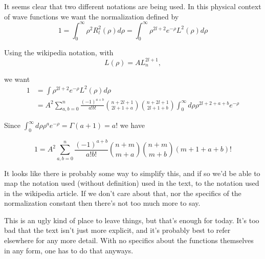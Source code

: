 It seems clear that two different notations are being used.  In this physical context of wave functions we want the normalization defined by
\begin{equation}\label{eqn:hyrdogenLaguerre:160}
1 = \int_0^\infty \rho^2 R_l^2(\rho) d\rho = \int_0^\infty \rho^{2l + 2} e^{-\rho} L^2(\rho) d\rho
\end{equation}

Using the wikipedia notation, with
\begin{equation}\label{eqn:hyrdogenLaguerre:170}
L(\rho) = A L_n^{2l+1},
\end{equation}

we want
\begin{align*}
1 
&= \int \rho^{2l + 2} e^{-\rho} L^2(\rho) d\rho \\
&= 
A^2 \sum_{a,b=0}^n \frac{(-1)^{a+b}}{a!b!} 
\binom{n+2l+1}{2l+1+a}
\binom{n+2l+1}{2l+1+b}
\int_0^\infty d\rho \rho^{2l + 2 + a + b} e^{-\rho} 
\end{align*}

Since $\int_0^\infty d\rho \rho^{a} e^{-\rho} = \Gamma(a+1) = a!$ we have

\begin{equation}\label{eqn:hyrdogenLaguerre:180}
1 = A^2 \sum_{a,b=0}^n \frac{(-1)^{a+b}}{a!b!} 
\binom{n+m}{m+a}
\binom{n+m}{m+b}
(m + 1 + a + b)!
\end{equation}

It looks like there is probably some way to simplify this, and if so we'd be able to map the notation used (without definition) used in the text, to the notation used in the wikipedia article.  If we don't care about that, nor the specifics of the normalization constant then there's not too much more to say.

This is an ugly kind of place to leave things, but that's enough for today.  It's too bad that the text isn't just more explicit, and it's probably best to refer elsewhere for any more detail.  With no specifics about the functions themselves in any form, one has to do that anyways.

\EndArticle
